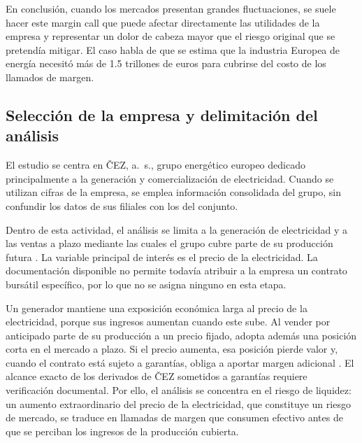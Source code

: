 \documentclass[11pt,letterpaper]{article}
\theoremstyle{plain}
\theoremstyle{definition}
\theoremstyle{remark}
\numberwithin{equation}{section}
\begin{document}
En conclusión, cuando los mercados presentan grandes fluctuaciones, se suele hacer este margin call que puede afectar directamente las utilidades de la empresa y representar un dolor de cabeza mayor que el riesgo original que se pretendía mitigar. El caso habla de que se estima que la industria Europea de energía necesitó más de 1.5 trillones de euros para cubrirse del costo de los llamados de margen. 

	\subsection{Selección de la empresa y delimitación del análisis}

	\noindent El estudio se centra en ČEZ, a.~s., grupo energético europeo dedicado principalmente a la generación y comercialización de electricidad. Cuando se utilizan cifras de la empresa, se emplea información consolidada del grupo, sin confundir los datos de sus filiales con los del conjunto.

	\vspace{0.2cm}

	\noindent Dentro de esta actividad, 
	el análisis se limita a la generación de electricidad y a 
	las ventas a plazo mediante las cuales el grupo 
	cubre parte de su producción futura \parencite{cez_q3_2021}. 
	La variable principal de interés es el precio de la electricidad. 
	La documentación disponible no permite todavía atribuir a la empresa un contrato bursátil específico, por lo que no se asigna ninguno en esta etapa.

	\vspace{0.2cm}

	\noindent Un generador mantiene una exposición económica larga 
	al precio de la electricidad, porque sus ingresos aumentan cuando 
	este sube. Al vender por anticipado parte de su producción a un 
	precio fijado, adopta además una posición corta en el mercado a 
	plazo. Si el precio aumenta, esa posición pierde valor y, cuando 
	el contrato está sujeto a garantías, obliga a aportar margen 
	adicional \parencite{GIANNOZZI2026107700}. El alcance exacto de 
	los derivados de ČEZ sometidos a garantías requiere verificación 
	documental. Por ello, el análisis se concentra en el riesgo de 
	liquidez: un aumento extraordinario del precio de la electricidad, 
	que constituye un riesgo de mercado, se traduce en llamadas de margen que 
	consumen efectivo antes de que se perciban los ingresos de la producción cubierta.
	

	\newpage

\printbibliography[title=Referencias]
\end{document}
